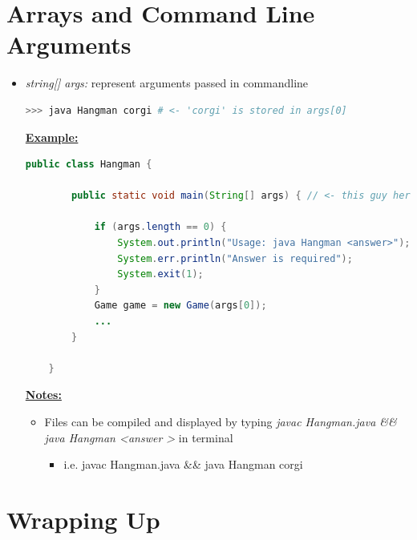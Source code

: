 \documentclass[12pt]{article}
\begin{document}
\bigskip

\section{Arrays and Command Line Arguments}

\bigskip

\begin{itemize}
    \item \textit{string[] args:} represent arguments passed in commandline


    \begin{lstlisting}[language=Bash]
    >>> java Hangman corgi # <- 'corgi' is stored in args[0]
    \end{lstlisting}

    \bigskip

    \underline{\textbf{Example:}}


    \begin{lstlisting}[language=Java,caption={lesson\_07/Hangman.java}]
    public class Hangman {

        public static void main(String[] args) { // <- this guy here :)

            if (args.length == 0) {
                System.out.println("Usage: java Hangman <answer>");
                System.err.println("Answer is required");
                System.exit(1);
            }
            Game game = new Game(args[0]);
            ...
        }

    }
    \end{lstlisting}

    \underline{\textbf{Notes:}}

    \bigskip

    \begin{itemize}
        \item Files can be compiled and displayed by typing \textit{javac Hangman.java \&\& java Hangman \textless answer \textgreater}
        in terminal
        \begin{itemize}
            \item i.e. javac Hangman.java \&\& java Hangman corgi
        \end{itemize}
    \end{itemize}
\end{itemize}

\bigskip

\section{Wrapping Up}

\bigskip
\end{document}
